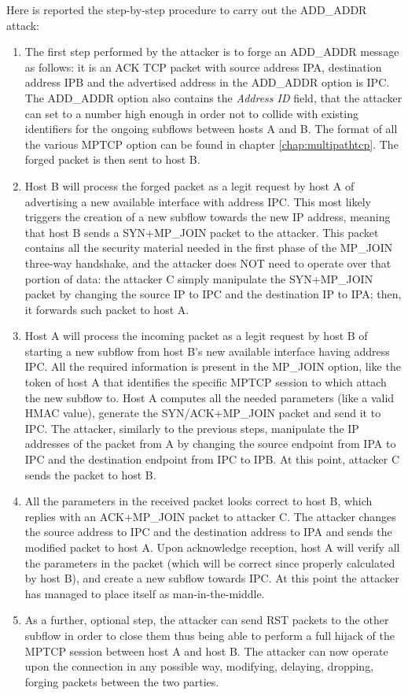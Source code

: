 Here is reported the step-by-step procedure to carry out the ADD\_ADDR attack:

\begin{enumerate}  
\item  The first step performed by the attacker is to forge an ADD\_ADDR message as follows: it is an ACK TCP packet with source address IPA, destination address IPB and the advertised address in the ADD\_ADDR option is IPC. The ADD\_ADDR option also contains the \textit{Address ID} field, that the attacker can set to a number high enough in order not to collide with existing identifiers for the ongoing subflows between hosts A and B. The format of all the various MPTCP option can be found in chapter \ref{chap:multipathtcp}.
The forged packet is then sent to host B.

\item Host B will process the forged packet as a legit request by host A of advertising a new available interface with address IPC. This most likely triggers the creation of a new subflow towards the new IP address, meaning that host B sends a SYN+MP\_JOIN packet to the attacker. This packet contains all the security material needed in the first phase of the MP\_JOIN three-way handshake, and the attacker does NOT need to operate over that portion of data: the attacker C simply manipulate the SYN+MP\_JOIN packet by changing the source IP to IPC and the destination IP to IPA; then, it forwards such packet to host A.

\item Host A will process the incoming packet as a legit request by host B of starting a new subflow from host B's new available interface having address IPC. All the required information is present in the MP\_JOIN option, like the token of host A that identifies the specific MPTCP session to which attach the new subflow to. Host A computes all the needed parameters (like a valid HMAC value), generate the SYN/ACK+MP\_JOIN packet and send it to IPC. The attacker, similarly to the previous steps, manipulate the IP addresses of the packet from A by changing the source endpoint from IPA to IPC and the destination endpoint from IPC to IPB. At this point, attacker C sends the packet to host B.

\item All the parameters in the received packet looks correct to host B, which replies with an ACK+MP\_JOIN packet to attacker C. The attacker changes the source address to IPC and the destination address to IPA and sends the modified packet to host A. Upon acknowledge reception, host A will verify all the parameters in the packet (which will be correct since properly calculated by host B), and create a new subflow towards IPC. At this point the attacker has managed to place itself as man-in-the-middle.

\item As a further, optional step, the attacker can send RST packets to the other subflow in order to close them thus being able to perform a full hijack of the MPTCP session between host A and host B. The attacker can now operate upon the connection in any possible way, modifying, delaying, dropping, forging packets between the two parties.
\end{enumerate}


